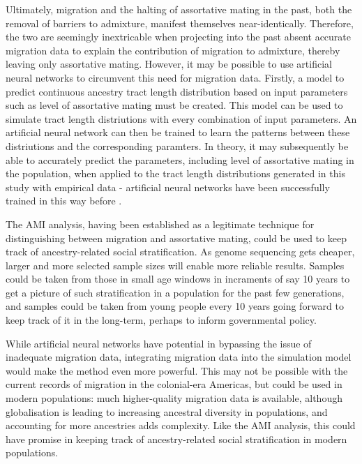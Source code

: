\documentclass[11pt]{article}
\begin{document}
Ultimately, migration and the halting of assortative mating in the past, both the removal of barriers to admixture, manifest themselves near-identically. Therefore, the two are seemingly inextricable when projecting into the past absent accurate migration data to explain the contribution of migration to admixture, thereby leaving only assortative mating. However, it may be possible to use artificial neural networks to circumvent this need for migration data. Firstly, a model to predict continuous ancestry tract length distribution based on input parameters such as level of assortative mating must be created. This model can be used to simulate tract length distriutions with every combination of input parameters. An artificial neural network can then be trained to learn the patterns between these distriutions and the corresponding paramters. In theory, it may subsequently be able to accurately predict the parameters, including level of assortative mating in the population, when applied to the tract length distributions generated in this study with empirical data - artificial neural networks have been successfully trained in this way before \parencite{Sheehan2016}. 

The AMI analysis, having been established as a legitimate technique for distinguishing between migration and assortative mating, could be used to keep track of ancestry-related social stratification. As genome sequencing gets cheaper, larger and more selected sample sizes will enable more reliable results. Samples could be taken from those in small age windows in incraments of say 10 years to get a picture of such stratification in a population for the past few generations, and samples could be taken from young people every 10 years going forward to keep track of it in the long-term, perhaps to inform governmental policy.

While artificial neural networks have potential in bypassing the issue of inadequate migration data, integrating migration data into the simulation model would make the method even more powerful. This may not be possible with the current records of migration in the colonial-era Americas, but could be used in modern populations: much higher-quality migration data is available, although globalisation is leading to increasing ancestral diversity in populations, and accounting for more ancestries adds complexity. Like the AMI analysis, this could have promise in keeping track of ancestry-related social stratification in modern populations.
\end{document}
